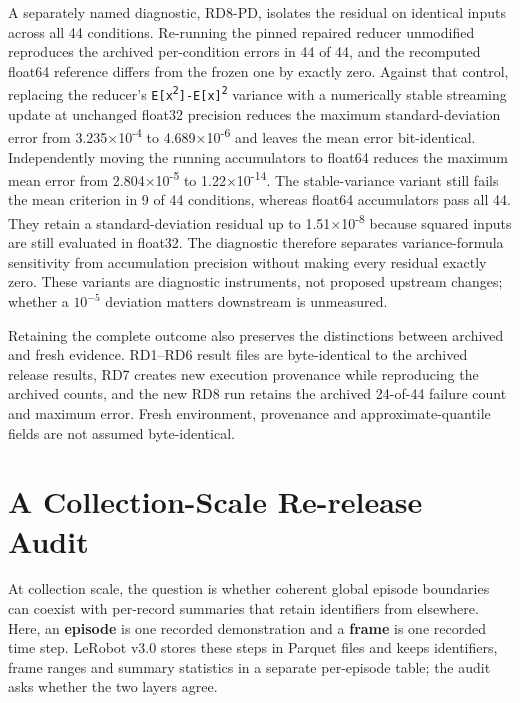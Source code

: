 \documentclass[conference]{IEEEtran}
\begin{document}
A separately named diagnostic, RD8-PD, isolates the residual on identical inputs across all 44 conditions. Re-running the pinned repaired reducer unmodified reproduces the archived per-condition errors in 44 of 44, and the recomputed float64 reference differs from the frozen one by exactly zero. Against that control, replacing the reducer's \texttt{E[x\textsuperscript{2}]-E[x]\textsuperscript{2}} variance with a numerically stable streaming update at unchanged float32 precision reduces the maximum standard-deviation error from 3.235×10\textsuperscript{-}\textsuperscript{4} to 4.689×10\textsuperscript{-}\textsuperscript{6} and leaves the mean error bit-identical. Independently moving the running accumulators to float64 reduces the maximum mean error from 2.804×10\textsuperscript{-}\textsuperscript{5} to 1.22×10\textsuperscript{-}\textsuperscript{1}\textsuperscript{4}. The stable-variance variant still fails the mean criterion in 9 of 44 conditions, whereas float64 accumulators pass all 44. They retain a standard-deviation residual up to 1.51×10\textsuperscript{-}\textsuperscript{8} because squared inputs are still evaluated in float32. The diagnostic therefore separates variance-formula sensitivity from accumulation precision without making every residual exactly zero. These variants are diagnostic instruments, not proposed upstream changes; whether a \(10^{-5}\) deviation matters downstream is unmeasured.\par

Retaining the complete outcome also preserves the distinctions between archived and fresh evidence. RD1--RD6 result files are byte-identical to the archived release results, RD7 creates new execution provenance while reproducing the archived counts, and the new RD8 run retains the archived 24-of-44 failure count and maximum error. Fresh environment, provenance and approximate-quantile fields are not assumed byte-identical.\par

\section{A Collection-Scale Re-release Audit}

At collection scale, the question is whether coherent global episode boundaries can coexist with per-record summaries that retain identifiers from elsewhere. Here, an \textbf{episode} is one recorded demonstration and a \textbf{frame} is one recorded time step. LeRobot v3.0 stores these steps in Parquet files and keeps identifiers, frame ranges and summary statistics in a separate per-episode table; the audit asks whether the two layers agree.\par
\end{document}
